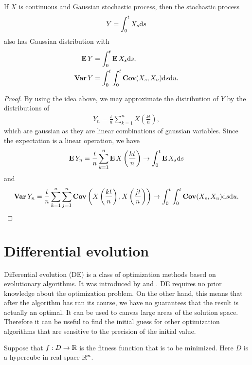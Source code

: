 \begin{thm}
	\label{gaussiancalculation}
If $X$ is continuous and Gaussian stochastic process, then the stochastic process
  \begin{align}
    Y = \int_0^t X_s \mathrm{d} s
  \end{align}
also has Gaussian distribution with
  \begin{align}
    \operatorname{\boldsymbol{\mathrm{E}}} Y &= \int_0^t \operatorname{\boldsymbol{\mathrm{E}}} X_s \mathrm{d} s, \\
    \operatorname{\boldsymbol{\mathrm{Var}}} Y &= \int_0^t \int_0^t \operatorname{\boldsymbol{\mathrm{Cov}}} (X_s, X_u) \mathrm{d} s \mathrm{d} u .
  \end{align}  
\end{thm}

\begin{proof}
By using the idea above, we may approximate the distribution of $Y$ by the distributions of
  \begin{align}
    Y_n = \frac{t}{n} \sum_{k=1}^n X \left( \frac{kt}{n} \right),
  \end{align}
which are gaussian as they are linear combinations of gaussian variables. Since the expectation is a linear operation, we have
  \begin{align}
    \operatorname{\boldsymbol{\mathrm{E}}} Y_n = \frac{t}{n} \sum_{k=1}^n \operatorname{\boldsymbol{\mathrm{E}}} X \left( \frac{kt}{n} \right) \rightarrow \int_0^t \operatorname{\boldsymbol{\mathrm{E}}} X_s \mathrm{d} s
  \end{align}
and
  \begin{align}
    \operatorname{\boldsymbol{\mathrm{Var}}} Y_n = \frac{t}{n} \sum_{k=1}^n \sum_{j=1}^n \operatorname{\boldsymbol{\mathrm{Cov}}} \left( X \left( \frac{kt}{n} \right), X \left( \frac{jt}{n} \right) \right) \rightarrow \int_0^t \int_0^t \operatorname{\boldsymbol{\mathrm{Cov}}} (X_s,X_u) \mathrm{d} s \mathrm{d} u .
  \end{align}
\end{proof}

\section{Differential evolution}

Differential evolution (DE) is a class of optimization methods based on evolutionary algorithms. It was introduced by \cite{storn1996usage} and \cite{storn1997differential}. DE requires no prior knowledge about the optimization problem. On the other hand, this means that after the algorithm has ran its course, we have no guarantees that the result is actually an optimal. It can be used to canvas large areas of the solution space. Therefore it can be useful to find the initial guess for other optimization algorithms that are sensitive to the precision of the initial value.

Suppose that $f: D \rightarrow \mathbb{R}$ is the fitness function that is to be minimized. Here $D$ is a hypercube in real space $\mathbb{R}^n$.

